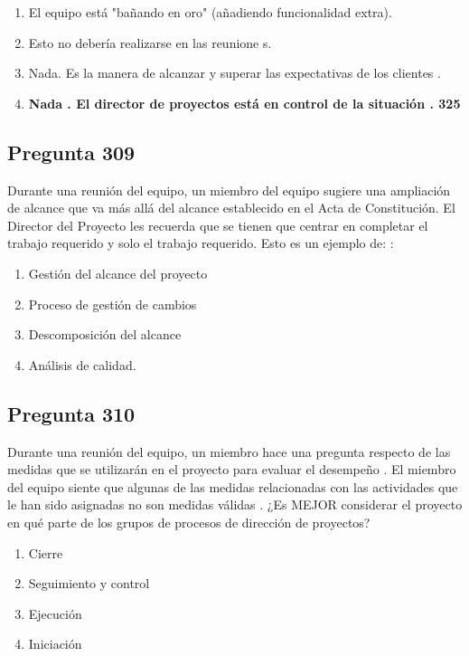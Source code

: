 \documentclass[11pt,a4paper]{article}
\begin{document}
\begin{enumerate}[label=\alph*)]
  \item El equipo está "bañando en oro" (añadiendo funcionalidad extra).
  \item Esto no debería realizarse en las reunione s.
  \item Nada. Es la manera de alcanzar y superar las expectativas de los clientes .
  \item \textbf{Nada . El director de proyectos está en control de la situación . 325}
\end{enumerate}

\subsection*{Pregunta 309}
Durante una reunión del equipo, un miembro del equipo sugiere una ampliación de alcance que va más allá del alcance establecido en el Acta de Constitución. El Director del Proyecto les recuerda que se tienen que centrar en completar el trabajo requerido y solo el trabajo requerido. Esto es un ejemplo de: :

\begin{enumerate}[label=\alph*)]
  \item Gestión del alcance del proyecto
  \item Proceso de gestión de cambios
  \item Descomposición del alcance
  \item Análisis de calidad.
\end{enumerate}

\subsection*{Pregunta 310}
Durante una reunión del equipo, un miembro hace una pregunta respecto de las medidas que se utilizarán en el proyecto para evaluar el desempeño . El miembro del equipo siente que algunas de las medidas relacionadas con las actividades que le han sido asignadas no son medidas válidas . ¿Es MEJOR considerar el proyecto en qué parte de los grupos de procesos de dirección de proyectos?

\begin{enumerate}[label=\alph*)]
  \item Cierre
  \item Seguimiento y control
  \item Ejecución
  \item Iniciación
\end{enumerate}
\end{document}
